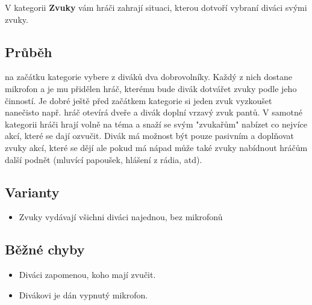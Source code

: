  
V kategorii \textbf{Zvuky}{} vám hráči zahrají situaci, kterou dotvoří vybraní diváci svými zvuky. 
 
 
\subsection{Průběh}  na začátku kategorie vybere z diváků dva dobrovolníky. Každý z nich dostane mikrofon a je mu přidělen hráč, kterému bude divák dotvářet zvuky podle jeho činností. Je dobré ještě před začátkem kategorie si jeden zvuk vyzkoušet nanečisto např. hráč otevírá dveře a divák doplní vrzavý zvuk pantů. V samotné kategorii hráči hrají volně na téma a snaží se svým "zvukařům"{} nabízet co nejvíce akcí, které se dají ozvučit. Divák má možnost být pouze pasivním a doplňovat zvuky akcí, které se dějí ale pokud má nápad může také zvuky nabídnout hráčům další podnět (mluvící papoušek, hlášení z rádia, atd). 
 
\subsection{ Varianty } \begin{itemize}
\item Zvuky vydávají všichni diváci najednou, bez mikrofonů
\end{itemize}
 
\subsection{ Běžné chyby } \begin{itemize}
\item Diváci zapomenou, koho mají zvučit.
\item Divákovi je dán vypnutý mikrofon.
\end{itemize}
 
 
 
 
